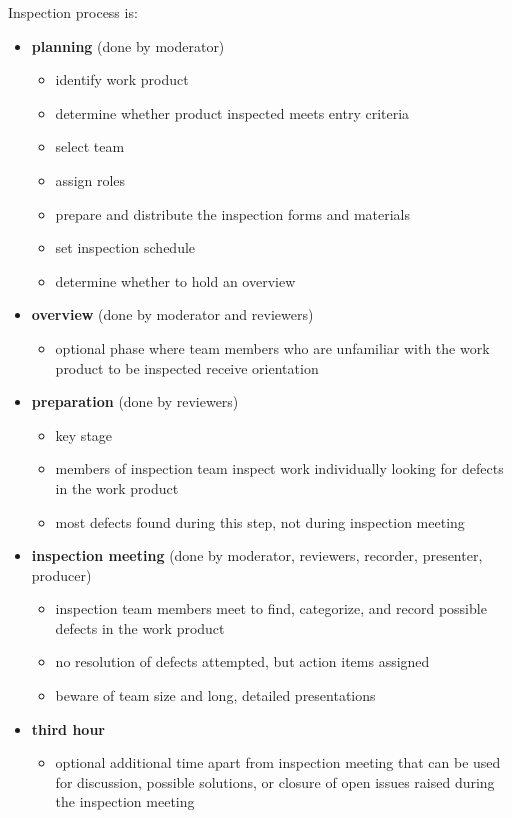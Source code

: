 \documentclass[11pt]{article}
\begin{document}
Inspection process is:
\begin{itemize}
\item \textbf{planning} (done by moderator)
\begin{itemize}
\item identify work product
\item determine whether product inspected meets entry criteria
\item select team
\item assign roles
\item prepare and distribute the inspection forms and materials
\item set inspection schedule
\item determine whether to hold an overview
\end{itemize}
\item \textbf{overview} (done by moderator and reviewers)
\begin{itemize}
\item optional phase where team members who are unfamiliar with the work product to be inspected
receive orientation
\end{itemize}
\item \textbf{preparation} (done by reviewers)
\begin{itemize}
\item key stage
\item members of inspection team inspect work individually looking for defects in the work product
\item most defects found during this step, not during inspection meeting
\end{itemize}
\item \textbf{inspection meeting} (done by moderator, reviewers, recorder, presenter, producer)
\begin{itemize}
\item inspection team members meet to find, categorize, and record possible defects in the work product
\item no resolution of defects attempted, but action items assigned
\item beware of team size and long, detailed presentations
\end{itemize}
\item \textbf{third hour}
\begin{itemize}
\item optional additional time apart from inspection meeting that can be used for discussion,
possible solutions, or closure of open issues raised during the inspection meeting

\end{itemize}
\end{itemize}
\end{document}
